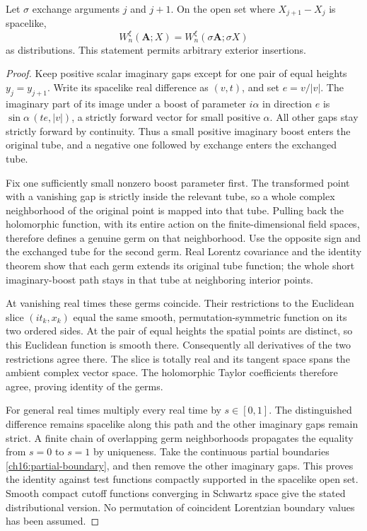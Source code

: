 \begin{proposition}
\label{ch16:locality}
Let $\sigma$ exchange arguments $j$ and $j+1$. On the open set where
$X_{j+1}-X_j$ is spacelike,
\[
 W_n^\xi(\boldsymbol A;X)
       =W_n^\xi(\sigma\boldsymbol A;\sigma X)
\]
as distributions. This statement permits arbitrary exterior insertions.
\end{proposition}
\begin{proof}
Keep positive scalar imaginary gaps except for one pair of equal heights
$y_j=y_{j+1}$. Write its spacelike real difference as $(v,t)$, and set
$e=v/|v|$. The imaginary part of its image under a boost of parameter
$i\alpha$ in direction $e$ is
$\sin\alpha\,(te,|v|)$, a strictly forward vector for small positive
$\alpha$. All other gaps stay strictly forward by continuity. Thus a
small positive imaginary boost enters the original tube, and a negative
one followed by exchange enters the exchanged tube.

Fix one sufficiently small nonzero boost parameter first. The transformed
point with a vanishing gap is strictly inside the relevant tube, so a whole complex
neighborhood of the original point is mapped into that tube. Pulling
back the holomorphic function, with its entire action on the finite-dimensional
field spaces, therefore defines a genuine germ on that neighborhood. Use the
opposite sign and the exchanged tube for the second germ. Real Lorentz covariance and the identity
theorem show that each germ extends its original tube function; the
whole short imaginary-boost path stays in that tube at neighboring
interior points.

At vanishing real times these germs coincide. Their restrictions to the
Euclidean slice $(it_k,x_k)$ equal the same smooth, permutation-symmetric
function on its two ordered sides. At the pair of equal heights the spatial points
are distinct, so this Euclidean function is smooth there. Consequently
all derivatives of the two restrictions agree there. The slice
is totally real and its tangent space spans the ambient complex vector
space. The holomorphic Taylor coefficients therefore agree, proving
identity of the germs.

For general real times multiply every real time by $s\in[0,1]$.
The distinguished difference remains spacelike along this path and the
other imaginary gaps remain strict. A finite chain of overlapping germ
neighborhoods propagates the equality from $s=0$ to $s=1$ by uniqueness.
Take the continuous partial boundaries \eqref{ch16:partial-boundary},
and then remove the other imaginary gaps. This proves the identity
against test functions compactly supported in the spacelike open set. Smooth
compact cutoff functions converging in Schwartz space give the stated distributional
version. No permutation of coincident Lorentzian boundary values has
been assumed.
\end{proof}

